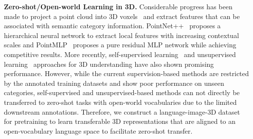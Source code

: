     \noindent\textbf{Zero-shot/Open-world Learning in 3D.}
    Considerable progress has been made to project a point cloud into 3D voxels~\citep{shi2020pv, maturana2015voxnet, qi2017pointnet} and extract features that can be associated with semantic category information. PointNet++~\citep{qi2017pointnet++} proposes a hierarchical neural network to extract local features with increasing contextual scales and PointMLP~\citep{ma2022rethinking} proposes a pure residual MLP network while achieving competitive results.
    More recently, self-supervised learning~\citep{yu2022point, pang2022masked} and unsupervised learning~\citep{afham2022crosspoint, liang2021exploring, liu2022masked} approaches for 3D understanding have also shown promising performance.
    However, while the current supervision-based methods are restricted by the annotated training datasets and show poor performance on unseen categories, self-supervised and unsupervised-based methods can not directly be transferred to zero-shot tasks with open-world vocabularies due to the limited downstream annotations. Therefore, we construct a language-image-3D dataset for pretraining to learn transferable 3D representations that are aligned to an open-vocabulary language space to facilitate zero-shot transfer.

